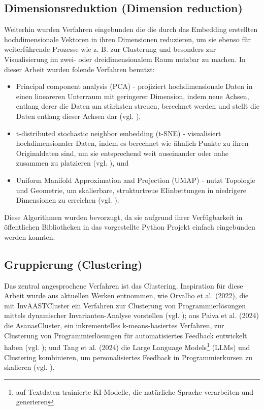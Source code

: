 \subsection{Dimensionsreduktion (Dimension reduction)}
Weiterhin wurden Verfahren eingebunden die die durch das Embedding erstellten  hochdimensionale Vektoren in ihren Dimensionen reduzieren, um sie ebenso für weiterführende Prozesse wie z. B. zur Clusterung und besonders zur Visualisierung im zwei- oder dreidimensionalem Raum nutzbar zu machen. In dieser Arbeit wurden folende Verfahren benutzt:
\begin{itemize}
    \item Principal component analysis (PCA) - projiziert hochdimensionale Daten in einen lineareren Unterraum mit geringerer Dimension, indem neue Achsen, entlang derer die Daten am stärksten streuen, berechnet werden und stellt die Daten entlang dieser Achsen dar (vgl. \cite{KarlPearson.1901}),
    \item t-distributed stochastic neighbor embedding (t-SNE) - visualisiert hochdimensionaler Daten, indem es berechnet wie ähnlich Punkte zu ihren Originaldaten sind, um sie entsprechend weit auseinander oder nahe zusammen zu platzieren (vgl. \cite{LaurensvanderMaatenundGeoffreyHinton.2008}), und
    \item Uniform Manifold Approximation and Projection (UMAP) - nutzt Topologie und Geometrie, um skalierbare, strukturtreue EIinbettungen in niedrigere Dimensionen zu erreichen (vgl. \cite{McInnes.09.02.2018}).
\end{itemize}
Diese Algorithmen wurden bevorzugt, da sie aufgrund ihrer Verfügbarkeit in öffentlichen Bibliotheken in das vorgestellte Python Projekt einfach eingebunden werden konnten.

\subsection{Gruppierung (Clustering)}
Das zentral angesprochene Verfahren ist das Clustering. Inspiration für diese Arbeit wurde aus aktuellen Werken entnommen, wie Orvalho et al. (2022), die mit InvAASTCluster ein Verfahren zur Clusterung von Programmierlösungen mittels dynamischer Invarianten-Analyse vorstellen (vgl. \cite{Orvalho.28.06.2022}); aus Paiva et al. (2024) die AsanasCluster, ein inkrementelles k-means-basiertes Verfahren, zur Clusterung von Programmierlösungen für automatisiertes Feedback entwickelt haben (vgl. \cite{Paiva.2024}); und Tang et al. (2024) die Large Language Models\footnote{auf Textdaten trainierte KI-Modelle, die natürliche Sprache verarbeiten und generieren} (LLMs) und Clustering kombinieren, um personalisiertes Feedback in Programmierkursen zu skalieren (vgl. \cite{Tang.21.10.2024}).

